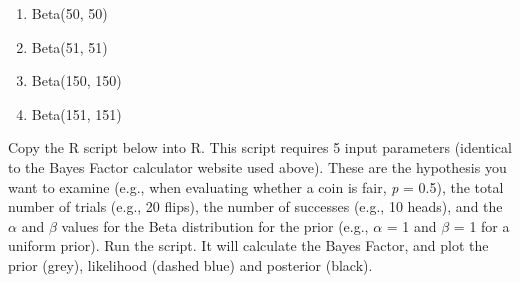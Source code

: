 \documentclass[
  oneside]{book}
\providecommand{\tightlist}{%
  \setlength{\itemsep}{0pt}\setlength{\parskip}{0pt}}
\begin{document}
\begin{enumerate}
\def\labelenumi{\Alph{enumi})}
\tightlist
\item
  Beta(50, 50)
\item
  Beta(51, 51)
\item
  Beta(150, 150)
\item
  Beta(151, 151)
\end{enumerate}

Copy the R script below into R. This script requires 5 input parameters (identical to the Bayes Factor calculator website used above). These are the hypothesis you want to examine (e.g., when evaluating whether a coin is fair, \emph{p} = 0.5), the total number of trials (e.g., 20 flips), the number of successes (e.g., 10 heads), and the \(\alpha\) and \(\beta\) values for the Beta distribution for the prior (e.g., \(\alpha\) = 1 and \(\beta\) = 1 for a uniform prior). Run the script. It will calculate the Bayes Factor, and plot the prior (grey), likelihood (dashed blue) and posterior (black).
\end{document}
